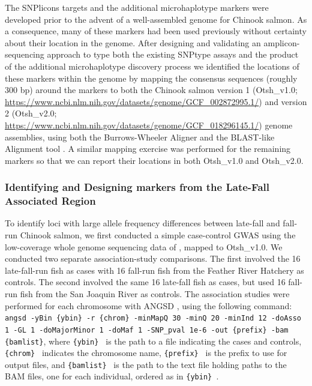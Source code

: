 The SNPlicons targets and the additional microhaplotype markers were
developed prior to the advent of a well-assembled genome for Chinook salmon.
As a consequence, many of these markers had
been used previously without certainty about their location in the genome.
After designing and validating an amplicon-sequencing approach to type both the
existing SNPtype assays and the product of the additional microhaplotype
discovery process we identified the locations of these markers within the genome by mapping the
consensus sequences (roughly 300 bp) around the markers
to both the Chinook salmon version 1 (Otsh\_v1.0; \url{https://www.ncbi.nlm.nih.gov/datasets/genome/GCF_002872995.1/}) and version 2  (Otsh\_v2.0; \url{https://www.ncbi.nlm.nih.gov/datasets/genome/GCF_018296145.1/}) genome assemblies,
using both the Burrows-Wheeler Aligner \citep{bwa-mem2009} and the BLAST-like Alignment tool \citep{kent2002blat}.
A similar mapping exercise was performed for the remaining markers so that we can
report their locations in both Otsh\_v1.0 and Otsh\_v2.0.


\subsubsection*{Identifying and Designing markers from the Late-Fall Associated Region}

To identify loci with large allele frequency differences between late-fall and fall-run Chinook salmon, 
we first conducted a simple case-control GWAS using the low-coverage whole genome sequencing 
data of \citet{thompson2020complex}, mapped to Otsh\_v1.0.  We conducted
two separate association-study comparisons.  
The first involved the 16 late-fall-run fish as cases with 16 fall-run fish from the Feather River Hatchery as controls. 
The second involved the same 16 late-fall fish as cases, but used 16 fall-run fish from the San 
Joaquin River as controls.  The association studies were performed for each chromosome with 
ANGSD \citep{pmid21663684,korneliussen_angsd_2014}, using the following command: {\footnotesize\tt angsd -yBin \{ybin\}  -r \{chrom\} 
-minMapQ 30 -minQ 20 -minInd 12 -doAsso 1 -GL 1 -doMajorMinor 1 -doMaf 1 -SNP\_pval 1e-6  
-out \{prefix\}  -bam \{bamlist\}}, where {\tt \{ybin\} } is the path to a file indicating the cases and 
controls, 
{\tt \{chrom\} } indicates the chromosome name, {\tt \{prefix\} } is the prefix to use for output files, and 
{\tt \{bamlist\} } is the path to the text file holding paths to the BAM files, one for each individual, ordered as in {\tt \{ybin\} }.

